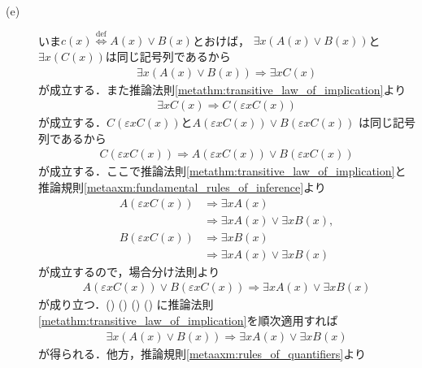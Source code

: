 \begin{prf}
\begin{description}
			\item[(e)]
				いま$c(x) \overset{\mathrm{def}}{\Longleftrightarrow} A(x) \vee B(x)$とおけば，
				$\exists x ( A(x) \vee B(x) )$と$\exists x ( C(x) )$は同じ記号列であるから
				\begin{align}
					\exists x ( A(x) \vee B(x) ) \Longrightarrow \exists x C(x)
					\label{eq:metathm_properties_of_quantifiers_1}
				\end{align}
				が成立する．また推論法則\ref{metathm:transitive_law_of_implication}より
				\begin{align}
					\exists x C(x) \Longrightarrow C(\varepsilon x C(x))
					\label{eq:metathm_properties_of_quantifiers_2}
				\end{align}
				が成立する．$C(\varepsilon x C(x))$と$A(\varepsilon x C(x)) \vee B(\varepsilon x C(x))$
				は同じ記号列であるから
				\begin{align}
					C(\varepsilon x C(x)) \Longrightarrow A(\varepsilon x C(x)) \vee B(\varepsilon x C(x))
					\label{eq:metathm_properties_of_quantifiers_3}
				\end{align}
				が成立する．ここで推論法則\ref{metathm:transitive_law_of_implication}と
				推論規則\ref{metaaxm:fundamental_rules_of_inference}より
				\begin{align}
					A(\varepsilon x C(x)) &\Longrightarrow \exists x A(x) \\
						&\Longrightarrow \exists x A(x) \vee \exists x B(x), \\
					B(\varepsilon x C(x)) &\Longrightarrow \exists x B(x) \\
						&\Longrightarrow \exists x A(x) \vee \exists x B(x)
				\end{align}
				が成立するので，場合分け法則より
				\begin{align}
					A(\varepsilon x C(x)) \vee B(\varepsilon x C(x))
					\Longrightarrow \exists x A(x) \vee \exists x B(x)
					\label{eq:metathm_properties_of_quantifiers_4}
				\end{align}
				が成り立つ．()
				()
				()
				()
				に推論法則\ref{metathm:transitive_law_of_implication}を順次適用すれば
				\begin{align}
					\exists x ( A(x) \vee B(x) ) \Longrightarrow \exists x A(x) \vee \exists x B(x)
				\end{align}
				が得られる．他方，推論規則\ref{metaaxm:rules_of_quantifiers}より

\end{description}
\end{prf}
